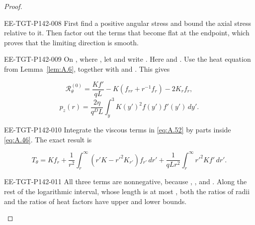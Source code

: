 \begin{proof}
\begin{EESegment}{EE-TGT-P142-008}
First find a positive angular stress and bound the axial stress relative to it. Then factor out the terms that become
flat at the endpoint, which proves that the limiting direction is smooth.
\end{EESegment}

\begin{EESegment}{EE-TGT-P142-009}
On , where , let
 and write . Here
 and . Use the heat equation from
Lemma~\ref{lem:A.6}, together with  and
. This gives
\end{EESegment}
\begin{equation}
  \mathscr R_\theta^{(0)}
  =\frac{Kf'}{qL}-K(f_{rr}+r^{-1}f_r)-2K_rf_r,
  \tag{A.52}\label{eq:A.52}
\end{equation}
\begin{equation}
  p_z(r)=\frac{2\eta}{q^DL}\int_y^3K(y')^2f(y')f'(y')\,dy'.
  \tag{A.53}\label{eq:A.53}
\end{equation}
\begin{EESegment}{EE-TGT-P142-010}
Integrate the viscous terms in \eqref{eq:A.52} by parts inside \eqref{eq:A.46}. The exact result is
\end{EESegment}
\begin{equation}
  T_\theta
  =Kf_r+\frac1{r^2}\int_r^\infty(r'K-r'^2K_{r'})f_{r'}\,dr'
  +\frac1{qLr^2}\int_r^\infty r'^2Kf'\,dr'.
  \tag{A.54}\label{eq:A.54}
\end{equation}
\begin{EESegment}{EE-TGT-P142-011}
All three terms are nonnegative, because ,
, and . Along the rest of the logarithmic interval, whose
length is at most , both the ratios of radii and the ratios of heat factors have upper and
lower bounds.
\end{EESegment}


\end{proof}
